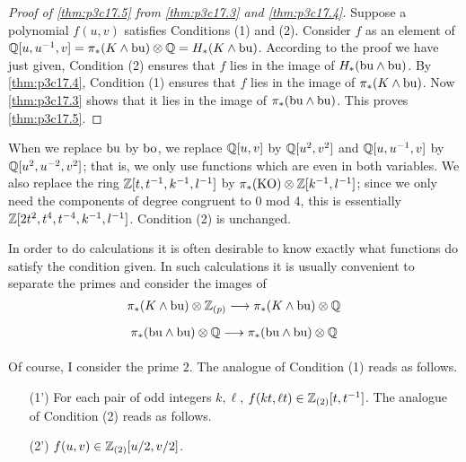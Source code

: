 \documentclass[../main]{subfiles}
\begin{document}
\begin{proof}[Proof of \ref{thm:p3c17.5} from \ref{thm:p3c17.3} and \ref{thm:p3c17.4}]
Suppose a polynomial $f(u,v)$ satisfies Conditions (1) and (2). Consider $f$ as an element of $\mathbb{Q}[u,u^{-1},v] = \pi_*(K\wedge\mathrm{bu})\otimes\mathbb{Q} = H_*(K\wedge\mathrm{bu})$. According to the proof we have just given, Condition (2) ensures that $f$ lies in the image of $H_*(\mathrm{bu}\wedge\mathrm{bu})$. By \ref{thm:p3c17.4}, Condition (1) ensures that $f$ lies in the image of $\pi_*(K\wedge\mathrm{bu})$. Now \ref{thm:p3c17.3} shows that it lies in the image of $\pi_*(\mathrm{bu}\wedge\mathrm{bu})$. This proves \ref{thm:p3c17.5}.
\end{proof}

\begin{remark*}
When we replace $\mathrm{bu}$ by $\mathrm{bo}$, we replace $\mathbb{Q}[u,v]$ by $\mathbb{Q}[u^2,v^2]$ and $\mathbb{Q}[u,u^{-1},v]$ by $\mathbb{Q}[u^2,u^{-2},v^2]$; that is, we only use functions which are even in both variables. We also replace the ring $\mathbb{Z}[t,t^{-1},k^{-1},l^{-1}]$ by $\pi_*(\mathrm{KO})\otimes\mathbb{Z}[k^{-1},l^{-1}]$; since we only need the components of degree congruent to 0 mod 4, this is essentially
$\mathbb{Z}[2t^2,t^4,t^{-4},k^{-1},l^{-1}]$. Condition (2) is unchanged.

In order to do calculations it is often desirable to know exactly what functions do satisfy the condition given. In such calculations it is usually convenient to separate the primes and consider the images of \[\pi_\ast(K \wedge \te{bu}) \otimes \bbZ_{(p)} \lar{} \pi_\ast(K \wedge \te{bu}) \otimes \bbQ\] \[\pi_\ast(\te{bu} \wedge \te{bu}) \otimes \bbQ \lar{} \pi_\ast(\te{bu} \wedge \te{bu}) \otimes \bbQ\]
\end{remark*}

Of course, I consider the prime $2$. The analogue of Condition (1) reads as follows.

\begin{enumerate}
    \item[(1')] For each pair of odd integers $k, \ell$, $f(kt, \ell t) \in \mathbb{Z}_{(2)}[t, t^{-1}]$.
    The analogue of Condition (2) reads as follows.
    \item[(2')] $f(u, v) \in \mathbb{Z}_{(2)}[u/2, v/2]$.
\end{enumerate}
\end{document}
